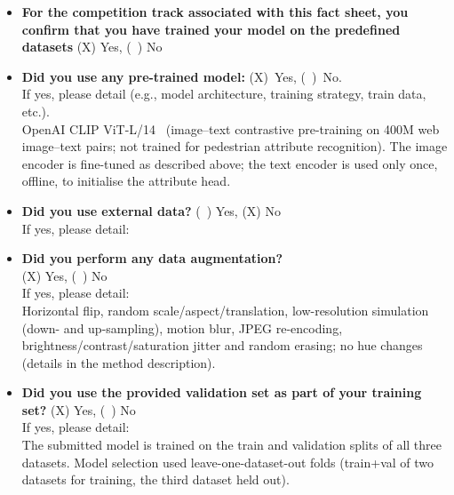 \documentclass[a4paper, 10pt, conference]{ieeeconf}
\begin{document}
%
%
\begin{itemize}
\item \textbf{For the competition track associated with this fact sheet, you confirm that you have trained your model on the predefined datasets} (X) Yes, (~) No\\

\item \textbf{Did you use any pre-trained model:} (X)~Yes, (~)~No.\\ If yes, please detail (e.g., model architecture, training strategy, train data, etc.).\\
%
%
OpenAI CLIP ViT-L/14~\cite{radford2021clip} (image--text contrastive pre-training on 400M web image--text pairs; not trained for pedestrian attribute recognition). The image encoder is fine-tuned as described above; the text encoder is used only once, offline, to initialise the attribute head.

\item \textbf{Did you use external data?} (~) Yes, (X) No\\
If yes, please detail:\\
%
%

\item \textbf{Did you perform any data augmentation?} \\(X) Yes, (~) No\\
If yes, please detail:\\
%
%
Horizontal flip, random scale/aspect/translation, low-resolution simulation (down- and up-sampling), motion blur, JPEG re-encoding, brightness/contrast/saturation jitter and random erasing; no hue changes (details in the method description).

\item \textbf{Did you use the provided validation set as part of your training set?} (X) Yes, (~) No\\
If yes, please detail:\\
%
%
The submitted model is trained on the train and validation splits of all three datasets. Model selection used leave-one-dataset-out folds (train+val of two datasets for training, the third dataset held out).



\end{itemize}
\end{document}
